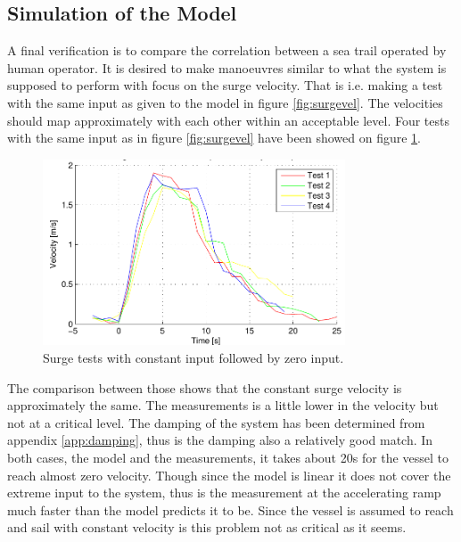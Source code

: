 \subsection{Simulation of the Model}
A final verification is to compare the correlation between a sea trail operated by human operator. It is desired to make manoeuvres similar to what the system is supposed to perform with focus on the surge velocity. That is i.e. making a test with the same input as given to the model in figure \ref{fig:surgevel}. The velocities should map approximately with each other within an acceptable level. Four tests with the same input as in figure \ref{fig:surgevel} have been showed on figure \ref{fig:surgeverify}.
\begin{figure}
  \centering
  \includegraphics[width=0.8\textwidth]{../../code/matlab/log-viewer/surgeverify}
  \caption{Surge tests with constant input followed by zero input.}
  \label{fig:surgeverify}
\end{figure}
The comparison between those shows that the constant surge velocity is approximately the same. The measurements is a little lower in the velocity but not at a critical level. The damping of the system has been determined from appendix \ref{app:damping}, thus is the damping also a relatively good match. In both cases, the model and the measurements, it takes about 20s for the vessel to reach almost zero velocity. Though since the model is linear it does not cover the extreme input to the system, thus is the measurement at the accelerating ramp much faster than the model predicts it to be. Since the vessel is assumed to reach and sail with constant velocity is this problem not as critical as it seems.